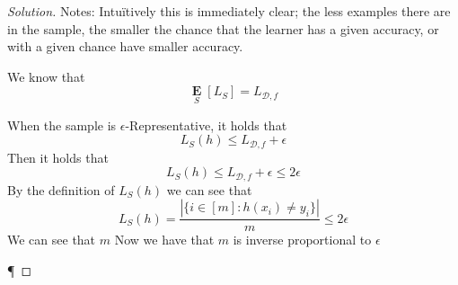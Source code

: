 \documentclass[10pt, a4paper, twoside]{amsart}
\newcommand{\R}{\ensuremath{\mathbb{R}}}
\DeclarePairedDelimiter\cbrac\{\}
\DeclarePairedDelimiter\paren()
\newcommand{\Ev}{\operatorname*{\ensuremath{\mathbf{E}}}}
\newenvironment{solution}
               {\let\oldqedsymbol=\qedsymbol
                \renewcommand{\qedsymbol}{$\blacktriangleleft$}
                \begin{proof}[Solution]}
               {\end{proof}
                \renewcommand{\qedsymbol}{\oldqedsymbol}}
\begin{document}
\begin{solution}

  Notes:
Intu\"itively this is immediately clear; the less examples there are in the sample, the smaller the chance that the learner has a given accuracy, or with a given chance have smaller accuracy.
  
  We know that 
  \begin{equation*}
    \Ev_{S}[L_S] = L_{\mathcal{D},f}
  \end{equation*}
  
  When the sample is $\epsilon$-Representative, it holds that
  \begin{equation*}
    L_S(h) \leq L_{\mathcal{D},f} +\epsilon
  \end{equation*}
  Then it holds that
  \begin{equation*}
    L_S(h) \leq L_{\mathcal{D},f} +\epsilon \leq 2\epsilon
  \end{equation*}
  By the definition of $L_S(h)$ we can see that
  \begin{equation*}
    L_S(h) = \frac{|\{i \in[m]:h(x_i)\neq y_i \}|}{m} \leq 2\epsilon
  \end{equation*}
  We can see that $m$ 
  Now we have that $m$ is inverse proportional to $\epsilon$
  \begin{equation*}
    
  \end{equation*}
  
  


¶
\end{solution}
\end{document}
